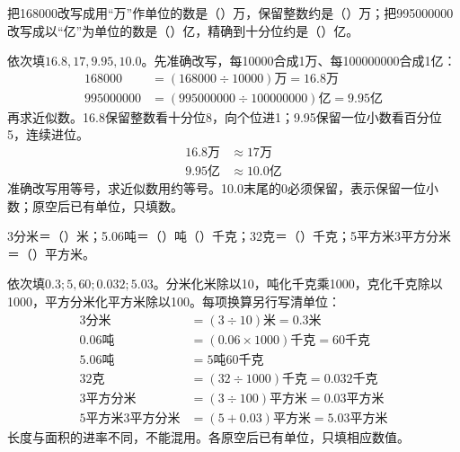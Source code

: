 把168000改写成用“万”作单位的数是（\hspace{1.8em}）万，保留整数约是（\hspace{1.8em}）万；把995000000改写成以“亿”为单位的数是（\hspace{1.8em}）亿，精确到十分位约是（\hspace{1.8em}）亿。\par
\begin{BookAnswer}
依次填\(16.8,17,9.95,10.0\)。先准确改写，每10000合成1万、每100000000合成1亿：\[\begin{aligned}168000&=(168000\div10000)\text{万}=16.8\text{万}\\995000000&=(995000000\div100000000)\text{亿}=9.95\text{亿}\end{aligned}\]再求近似数。16.8保留整数看十分位8，向个位进1；9.95保留一位小数看百分位5，连续进位。\[\begin{aligned}16.8\text{万}&\approx17\text{万}\\9.95\text{亿}&\approx10.0\text{亿}\end{aligned}\]准确改写用等号，求近似数用约等号。10.0末尾的0必须保留，表示保留一位小数；原空后已有单位，只填数。
\end{BookAnswer}

3分米＝（\hspace{1.8em}）米；5.06吨＝（\hspace{1.8em}）吨（\hspace{1.8em}）千克；32克＝（\hspace{1.8em}）千克；5平方米3平方分米＝（\hspace{1.8em}）平方米。\par
\begin{BookAnswer}
依次填\(0.3;5,60;0.032;5.03\)。分米化米除以10，吨化千克乘1000，克化千克除以1000，平方分米化平方米除以100。每项换算另行写清单位：\[\begin{aligned}3\text{分米}&=(3\div10)\text{米}=0.3\text{米}\\0.06\text{吨}&=(0.06\times1000)\text{千克}=60\text{千克}\\5.06\text{吨}&=5\text{吨}60\text{千克}\\32\text{克}&=(32\div1000)\text{千克}=0.032\text{千克}\\3\text{平方分米}&=(3\div100)\text{平方米}=0.03\text{平方米}\\5\text{平方米}3\text{平方分米}&=(5+0.03)\text{平方米}=5.03\text{平方米}\end{aligned}\]长度与面积的进率不同，不能混用。各原空后已有单位，只填相应数值。
\end{BookAnswer}

